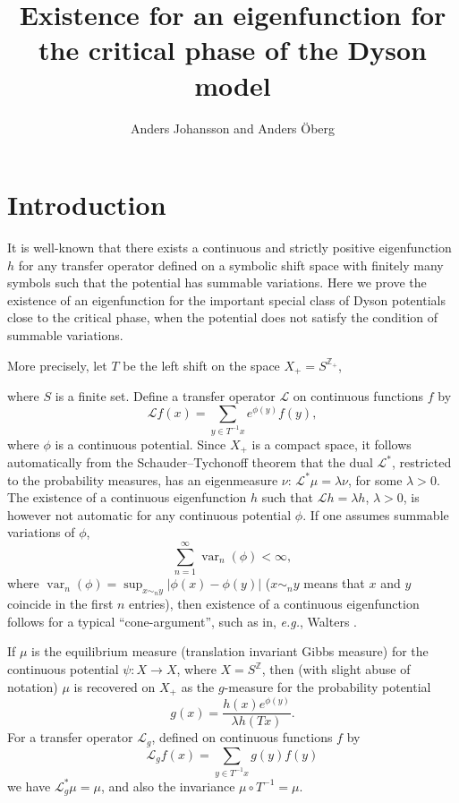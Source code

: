 \documentclass[11pt, a4paper, oneside]{article}
\title{Existence for an eigenfunction for the critical phase of the Dyson model}
\author{Anders Johansson and Anders \"Oberg}
\date{}
\theoremstyle{definition}
\theoremstyle{remark}
\providecommand{\opn}{\operatorname}
\providecommand{\var}{\opn{var}}
\begin{document}
\maketitle


\section{Introduction}\noindent
It is well-known that there exists a continuous and strictly positive
eigenfunction $h$ for any transfer operator defined on a symbolic shift space
with finitely many symbols such that the potential has summable variations. Here
we prove the existence of an eigenfunction for the important special class of
Dyson potentials close to the critical phase, when the potential does not
satisfy the condition of summable variations.

\def\h{h}
More precisely, let $T$ be the left shift on the space $X_+=S^{{\mathbb Z}_+}$,

where $S$ is a finite set. Define a transfer operator ${\mathcal L}$ on
continuous functions $f$ by
\begin{equation}\label{trans} {\mathcal L} f(x)= \sum_{y\in T^{-1}x}
  e^{\phi(y)}f(y),
\end{equation}
where $\phi$ is a continuous potential. Since $X_+$ is a compact space, it
follows automatically from the Schauder--Tychonoff theorem that the dual
${\mathcal L}^*$, restricted to the probability measures, has an eigenmeasure
$\nu$: ${\mathcal L}^* \mu=\lambda \nu$, for some $\lambda>0$. The existence of
a continuous eigenfunction $h$ such that ${\mathcal L}h=\lambda h$, $\lambda>0$,
is however not automatic for any continuous potential $\phi$. If one assumes
summable variations of $\phi$,
\begin{equation}\label{sum}
  \sum_{n=1}^\infty \var_n (\phi)<\infty,
\end{equation}
where $\var_n(\phi)=\sup_{x\sim_n y}|\phi(x)-\phi(y)|$ ($x\sim_n y$ means that
$x$ and $y$ coincide in the first $n$ entries), then existence of a continuous
eigenfunction follows for a typical ``cone-argument'', such as in, {\em e.g.},
Walters \cite{walters1}.

If $\mu$ is the equilibrium measure (translation invariant Gibbs measure) for
the continuous potential $\psi:X\to X$, where $X=S^{\mathbb Z}$, then (with
slight abuse of notation) $\mu$ is recovered on $X_+$ as the $g$-measure for the
probability potential
\begin{equation}\label{g}
  g(x)= \frac{h(x) e^{\phi(y)}}{\lambda h(Tx)}.
\end{equation} 
For a transfer operator ${\mathcal L}_g$, defined on continuous functions $f$ by
\begin{equation} {\mathcal L}_g f(x)=\sum_{y\in T^{-1}x} g(y) f(y)
\end{equation}
we have ${\mathcal L}_g^*\mu=\mu$, and also the invariance $\mu\circ
T^{-1}=\mu$.
\end{document}
